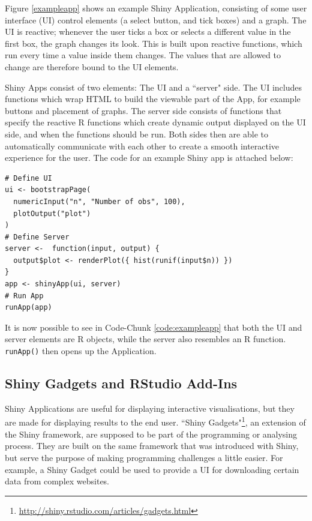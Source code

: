 \documentclass[12pt]{article} %
\newcommand{\li}{\lstinline}
\begin{document}
Figure \ref{exampleapp} shows an example Shiny Application, consisting of some user interface (UI) control elements (a select button, and tick boxes) and a graph. The UI is reactive; whenever the user ticks a box or selects a different value in the first box, the graph changes its look. This is built upon reactive functions, which run every time a value inside them changes. The values that are allowed to change are therefore bound to the UI elements.

Shiny Apps consist of two elements: The UI and a ``server" side. The UI includes functions which wrap HTML to build the viewable part of the App, for example buttons and placement of graphs. The server side consists of functions that specify the reactive R functions which create dynamic output displayed on the UI side, and when the functions should be run. Both sides then are able to automatically communicate with each other to create a smooth interactive experience for the user. The code for an example Shiny app is attached below:

\begin{lstlisting}[caption = Example code for a Shiny Application\cite{w2}., label = code:exampleapp]
# Define UI
ui <- bootstrapPage(
  numericInput("n", "Number of obs", 100),
  plotOutput("plot")
)
# Define Server
server <-  function(input, output) {
  output$plot <- renderPlot({ hist(runif(input$n)) })
}
app <- shinyApp(ui, server)
# Run App
runApp(app)
\end{lstlisting}

It is now possible to see in Code-Chunk \ref{code:exampleapp} that both the UI and server elements are R objects, while the server also resembles an R function. \li{runApp()} then opens up the Application.

\subsection{Shiny Gadgets and RStudio Add-Ins}
\label{shinyrstudiochapter}

Shiny Applications are useful for displaying interactive visualisations, but they are made for displaying results to the end user. ``Shiny Gadgets"\footnote{\url{http://shiny.rstudio.com/articles/gadgets.html}}, an extension of the Shiny framework, are supposed to be part of the programming or analysing process. They are built on the same framework that was introduced with Shiny, but serve the purpose of making programming challenges a little easier. For example, a Shiny Gadget could be used to provide a UI for downloading certain data from complex websites. 
\end{document}
